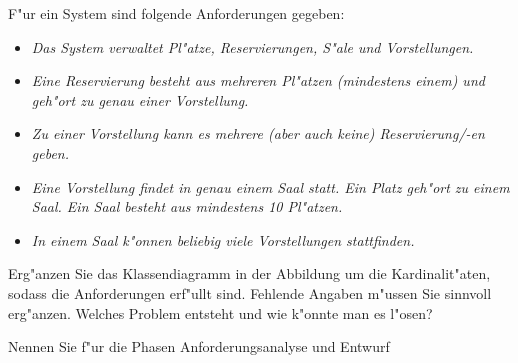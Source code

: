 \documentclass[12pt]{exam}
\begin{document}
\begin{questions}
\question[5] F"ur ein System sind folgende Anforderungen gegeben:
\begin{itemize}
    \item \emph{Das System verwaltet Pl"atze, Reservierungen, S"ale und Vorstellungen.}
    \item \emph{Eine Reservierung besteht aus mehreren Pl"atzen (mindestens einem) und geh"ort zu genau einer Vorstellung.}
    \item \emph{Zu einer Vorstellung kann es mehrere (aber auch keine) Reservierung/-en geben.}
    \item \emph{Eine Vorstellung findet in genau einem Saal statt. Ein Platz geh"ort zu einem Saal. Ein Saal besteht aus mindestens 10 Pl"atzen.}
    \item \emph{In einem Saal k"onnen beliebig viele Vorstellungen stattfinden.}
\end{itemize}
Erg"anzen Sie das Klassendiagramm in der Abbildung um die Kardinalit"aten, sodass die Anforderungen erf"ullt sind. Fehlende Angaben m"ussen Sie sinnvoll erg"anzen. Welches Problem entsteht und wie k"onnte man es l"osen? \\
\addpoints
{}

\question[5] Nennen Sie f"ur die Phasen Anforderungsanalyse und Entwurf
\noaddpoints
{}


\end{questions}
\end{document}
